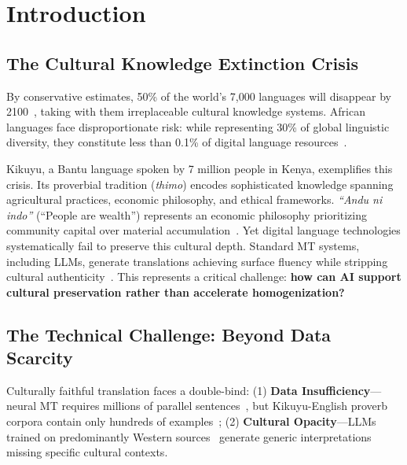 
\section{Introduction}
\label{sec:introduction}

\subsection{The Cultural Knowledge Extinction Crisis}
\label{subsec:crisis}

By conservative estimates, 50\% of the world's 7,000 languages will disappear by 2100~\cite{krauss1992worlds}, taking with them irreplaceable cultural knowledge systems. African languages face disproportionate risk: while representing 30\% of global linguistic diversity, they constitute less than 0.1\% of digital language resources~\cite{joshi2020state}.

Kikuyu, a Bantu language spoken by 7 million people in Kenya, exemplifies this crisis. Its proverbial tradition (\emph{thimo}) encodes sophisticated knowledge spanning agricultural practices, economic philosophy, and ethical frameworks. \emph{``Andu ni indo''} (``People are wealth'') represents an economic philosophy prioritizing community capital over material accumulation~\cite{mbiti1990african}. Yet digital language technologies systematically fail to preserve this cultural depth. Standard MT systems, including LLMs, generate translations achieving surface fluency while stripping cultural authenticity~\cite{blodgett2020language}. This represents a critical challenge: \textbf{how can AI support cultural preservation rather than accelerate homogenization?}

\subsection{The Technical Challenge: Beyond Data Scarcity}
\label{subsec:technical_challenge}

Culturally faithful translation faces a double-bind: (1) \textbf{Data Insufficiency}---neural MT requires millions of parallel sentences~\cite{koehn2017neural}, but Kikuyu-English proverb corpora contain only hundreds of examples~\cite{barra1960kikuyu,ireri2019proverbs}; (2) \textbf{Cultural Opacity}---LLMs trained on predominantly Western sources~\cite{bender2021dangers} generate generic interpretations missing specific cultural contexts.


